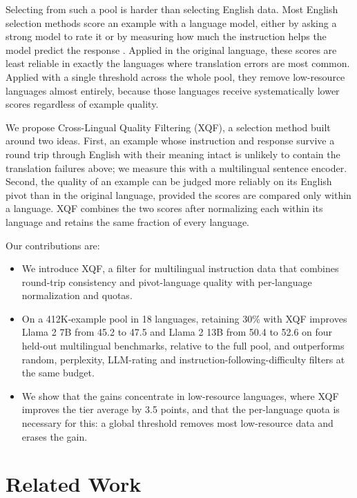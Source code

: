 \documentclass{article}
\begin{document}
Selecting from such a pool is harder than selecting English data. Most English selection methods score an example with a language model, either by asking a strong model to rate it \citep{chen2024alpagasus} or by measuring how much the instruction helps the model predict the response \citep{li2024ifd}. Applied in the original language, these scores are least reliable in exactly the languages where translation errors are most common. Applied with a single threshold across the whole pool, they remove low-resource languages almost entirely, because those languages receive systematically lower scores regardless of example quality.

We propose Cross-Lingual Quality Filtering (XQF), a selection method built around two ideas. First, an example whose instruction and response survive a round trip through English with their meaning intact is unlikely to contain the translation failures above; we measure this with a multilingual sentence encoder. Second, the quality of an example can be judged more reliably on its English pivot than in the original language, provided the scores are compared only within a language. XQF combines the two scores after normalizing each within its language and retains the same fraction of every language.

Our contributions are:
\begin{itemize}
\item We introduce XQF, a filter for multilingual instruction data that combines round-trip consistency and pivot-language quality with per-language normalization and quotas.
\item On a 412K-example pool in 18 languages, retaining 30\% with XQF improves Llama 2 7B from 45.2 to 47.5 and Llama 2 13B from 50.4 to 52.6 on four held-out multilingual benchmarks, relative to the full pool, and outperforms random, perplexity, LLM-rating and instruction-following-difficulty filters at the same budget.
\item We show that the gains concentrate in low-resource languages, where XQF improves the tier average by 3.5 points, and that the per-language quota is necessary for this: a global threshold removes most low-resource data and erases the gain.
\end{itemize}

\section{Related Work}
\label{sec:related}
\end{document}
